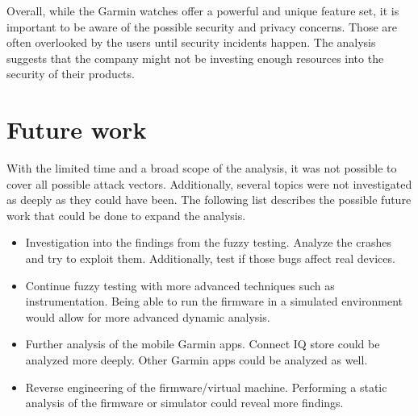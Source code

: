 Overall, while the Garmin watches offer a powerful and unique feature set, it is important to be aware of the possible security and privacy concerns.
Those are often overlooked by the users until security incidents happen.
The analysis suggests that the company might not be investing enough resources into the security of their products.

\section{Future work}

With the limited time and a broad scope of the analysis, it was not possible to cover all possible attack vectors.
Additionally, several topics were not investigated as deeply as they could have been.
The following list describes the possible future work that could be done to expand the analysis.

\begin{itemize}
    \item Investigation into the findings from the fuzzy testing.
    Analyze the crashes and try to exploit them.
    Additionally, test if those bugs affect real devices.
    \item Continue fuzzy testing with more advanced techniques such as instrumentation.
    Being able to run the firmware in a simulated environment would allow for more advanced dynamic analysis.
    \item Further analysis of the mobile Garmin apps.
    Connect IQ store could be analyzed more deeply.
    Other Garmin apps could be analyzed as well.
    \item Reverse engineering of the firmware/virtual machine.
    Performing a static analysis of the firmware or simulator could reveal more findings.
\end{itemize}